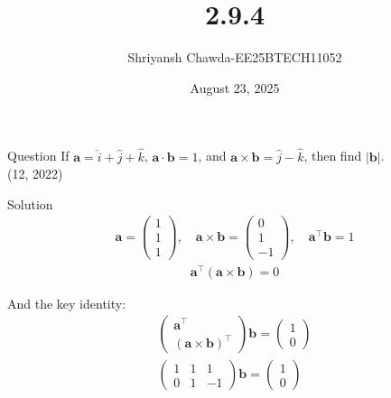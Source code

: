 \documentclass{beamer}
\title{2.9.4}
\author{Shriyansh Chawda-EE25BTECH11052}
\date{August 23, 2025}
\newcommand{\myvec}[1]{\ensuremath{\begin{pmatrix}#1\end{pmatrix}}}
\begin{document}
	

		\frame{\titlepage}
	
	
	

	\begin{frame}{Question} 
	If $\mathbf{a} = \hat{i} + \hat{j} + \hat{k}$, $\mathbf{a} \cdot \mathbf{b} = 1$, and $\mathbf{a} \times \mathbf{b} = \hat{j} - \hat{k}$, then find $|\mathbf{b}|$.\\
\hfill{(12, 2022)}

	\end{frame}
	
\begin{frame}{Solution}
\begin{align}
	\mathbf{a} = \myvec{1\\1\\1}, \quad \mathbf{a} \times \mathbf{b} = \myvec{0\\1\\-1}, \quad \mathbf{a}^\top\mathbf{b} = 1
\end{align}
\begin{align}
	\mathbf{a}^\top(\mathbf{a} \times \mathbf{b}) = 0
\end{align}

And the key identity:
\begin{align}
	\begin{pmatrix}\mathbf{a}^\top \\ (\mathbf{a} \times \mathbf{b})^\top\end{pmatrix}\mathbf{b} = \myvec{1\\0}\\
	\myvec{1 & 1 & 1\\0 & 1 & -1}\mathbf{b} = \myvec{1\\0}
\end{align}


\end{frame}
\end{document}
